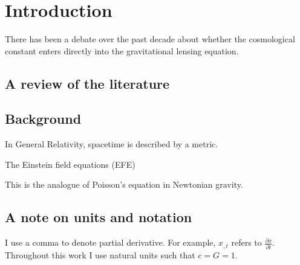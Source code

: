 \chapter{Introduction}

There has been a debate over the past decade about whether the cosmological constant enters directly into the gravitational lensing equation. 

\section{A review of the literature}


\section{Background}

In General Relativity, spacetime is described by a metric. 

The Einstein field equations (EFE)

This is the analogue of Poisson's equation in Newtonian gravity. 

\section{A note on units and notation}
I use a comma to denote partial derivative. For example, $x_{,t}$ refers to $\frac{\partial x}{\partial t}$. Throughout this work I use natural units such that $c = G = 1$. 